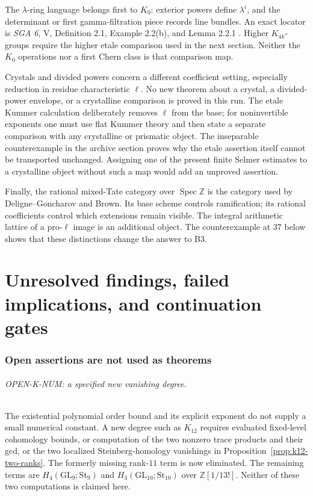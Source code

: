 \documentclass[11pt,a4paper]{article}
\theoremstyle{definition}
\begin{document}
The $\lambda$-ring language belongs first to $K_0$: exterior powers
define $\lambda^i$, and the determinant or first gamma-filtration
piece records line bundles. An exact locator is \emph{SGA 6}, V,
Definition 2.1, Example 2.2(b), and Lemma 2.2.1 \cite{SGA6}. Higher $K_{4k}$-groups
require the higher etale comparison used in the next section. Neither
the $K_0$ operations nor a first Chern class is that comparison map.

Crystals and divided powers concern a different coefficient setting,
especially reduction in residue characteristic $\ell$. No new theorem
about a crystal, a divided-power envelope, or a crystalline comparison
is proved in this run. The etale Kummer calculation deliberately removes
$\ell$ from the base; for noninvertible exponents one must use flat
Kummer theory and then state a separate comparison with any crystalline
or prismatic object. The inseparable counterexample in the archive
section proves why the etale assertion itself cannot be transported
unchanged. Assigning one of the present finite Selmer estimates to a
crystalline object without such a map would add an unproved assertion.

Finally, the rational mixed-Tate category over $\operatorname{Spec}
\mathbb Z$ is the category used by Deligne--Goncharov and Brown. Its
base scheme controls ramification; its rational coefficients control
which extensions remain visible. The integral arithmetic lattice of a
pro-$\ell$ image is an additional object. The counterexample at $37$
below shows that these distinctions change the answer to B3.



\clearpage
\part{Unresolved findings, failed implications, and continuation gates}
\section{Open assertions are not used as theorems}

\paragraph{OPEN-K-NUM: a specified new vanishing degree.}
The existential polynomial order bound and its explicit exponent do
not supply a small numerical constant. A new degree such as $K_{12}$
requires evaluated fixed-level cohomology bounds, or computation of the
two nonzero trace products and their gcd, or the two localized
Steinberg-homology vanishings in Proposition~\ref{prop:k12-two-ranks}.
The formerly missing rank-$11$ term is now eliminated. The remaining
terms are $H_4(\mathrm{GL}_9;\mathrm{St}_9)$ and
$H_3(\mathrm{GL}_{10};\mathrm{St}_{10})$ over $\mathbb Z[1/13!]$.
Neither of these two computations is claimed here.
\end{document}
